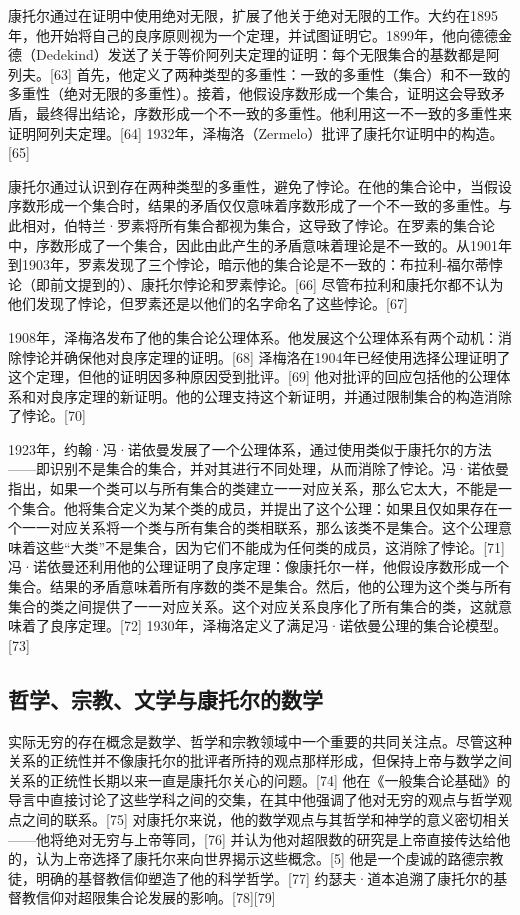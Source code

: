 康托尔通过在证明中使用绝对无限，扩展了他关于绝对无限的工作。大约在1895年，他开始将自己的良序原则视为一个定理，并试图证明它。1899年，他向德德金德（Dedekind）发送了关于等价阿列夫定理的证明：每个无限集合的基数都是阿列夫。[63] 首先，他定义了两种类型的多重性：一致的多重性（集合）和不一致的多重性（绝对无限的多重性）。接着，他假设序数形成一个集合，证明这会导致矛盾，最终得出结论，序数形成一个不一致的多重性。他利用这一不一致的多重性来证明阿列夫定理。[64] 1932年，泽梅洛（Zermelo）批评了康托尔证明中的构造。[65]

康托尔通过认识到存在两种类型的多重性，避免了悖论。在他的集合论中，当假设序数形成一个集合时，结果的矛盾仅仅意味着序数形成了一个不一致的多重性。与此相对，伯特兰·罗素将所有集合都视为集合，这导致了悖论。在罗素的集合论中，序数形成了一个集合，因此由此产生的矛盾意味着理论是不一致的。从1901年到1903年，罗素发现了三个悖论，暗示他的集合论是不一致的：布拉利-福尔蒂悖论（即前文提到的）、康托尔悖论和罗素悖论。[66] 尽管布拉利和康托尔都不认为他们发现了悖论，但罗素还是以他们的名字命名了这些悖论。[67]

1908年，泽梅洛发布了他的集合论公理体系。他发展这个公理体系有两个动机：消除悖论并确保他对良序定理的证明。[68] 泽梅洛在1904年已经使用选择公理证明了这个定理，但他的证明因多种原因受到批评。[69] 他对批评的回应包括他的公理体系和对良序定理的新证明。他的公理支持这个新证明，并通过限制集合的构造消除了悖论。[70]

1923年，约翰·冯·诺依曼发展了一个公理体系，通过使用类似于康托尔的方法——即识别不是集合的集合，并对其进行不同处理，从而消除了悖论。冯·诺依曼指出，如果一个类可以与所有集合的类建立一一对应关系，那么它太大，不能是一个集合。他将集合定义为某个类的成员，并提出了这个公理：如果且仅如果存在一个一一对应关系将一个类与所有集合的类相联系，那么该类不是集合。这个公理意味着这些“大类”不是集合，因为它们不能成为任何类的成员，这消除了悖论。[71] 冯·诺依曼还利用他的公理证明了良序定理：像康托尔一样，他假设序数形成一个集合。结果的矛盾意味着所有序数的类不是集合。然后，他的公理为这个类与所有集合的类之间提供了一一对应关系。这个对应关系良序化了所有集合的类，这就意味着了良序定理。[72] 1930年，泽梅洛定义了满足冯·诺依曼公理的集合论模型。[73]
\subsection{哲学、宗教、文学与康托尔的数学}
实际无穷的存在概念是数学、哲学和宗教领域中一个重要的共同关注点。尽管这种关系的正统性并不像康托尔的批评者所持的观点那样形成，但保持上帝与数学之间关系的正统性长期以来一直是康托尔关心的问题。[74] 他在《一般集合论基础》的导言中直接讨论了这些学科之间的交集，在其中他强调了他对无穷的观点与哲学观点之间的联系。[75] 对康托尔来说，他的数学观点与其哲学和神学的意义密切相关——他将绝对无穷与上帝等同，[76] 并认为他对超限数的研究是上帝直接传达给他的，认为上帝选择了康托尔来向世界揭示这些概念。[5] 他是一个虔诚的路德宗教徒，明确的基督教信仰塑造了他的科学哲学。[77] 约瑟夫·道本追溯了康托尔的基督教信仰对超限集合论发展的影响。[78][79]

